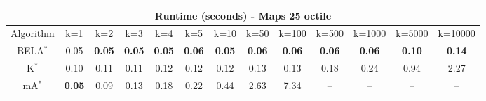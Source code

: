 \begin{tabular}{c|cccccccccccc}\toprule
\multicolumn{13}{c}{Runtime (seconds) - Maps 25 octile}\\ \midrule
Algorithm & k=1 & k=2 & k=3 & k=4 & k=5 & k=10 & k=50 & k=100 & k=500 & k=1000 & k=5000 & k=10000 \\ \midrule
BELA$^*$ & 0.05 & \textbf{0.05} & \textbf{0.05} & \textbf{0.05} & \textbf{0.06} & \textbf{0.05} & \textbf{0.06} & \textbf{0.06} & \textbf{0.06} & \textbf{0.06} & \textbf{0.10} & \textbf{0.14} \\
K$^*$ & 0.10 & 0.11 & 0.11 & 0.12 & 0.12 & 0.12 & 0.13 & 0.13 & 0.18 & 0.24 & 0.94 & 2.27 \\
mA$^*$ & \textbf{0.05} & 0.09 & 0.13 & 0.18 & 0.22 & 0.44 & 2.63 & 7.34 & -- & -- & -- & -- \\ \bottomrule 
\end{tabular}
